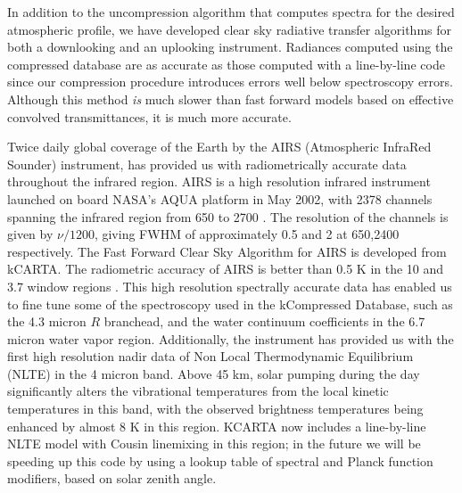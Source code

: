 \documentclass[11pt]{article}
\newcommand{\kc}{\textsf{kCARTA}\xspace}
\begin{document}
In addition to the uncompression algorithm that computes spectra for the
desired atmospheric profile, we have developed clear sky radiative transfer 
algorithms for both a downlooking and an uplooking instrument. Radiances 
computed using the compressed database are as accurate as those computed with
a line-by-line code since our compression procedure introduces errors well 
below spectroscopy errors. Although this method {\em is} much slower than 
fast forward models based on effective convolved transmittances, it is much 
more accurate. 

Twice daily global coverage of the Earth by the AIRS (Atmospheric
InfraRed Sounder) instrument, has provided 
us with radiometrically accurate data throughout the infrared
region. AIRS is a high resolution infrared instrument launched on
board NASA's AQUA platform in May 2002, with 2378 channels spanning
the infrared region from 650 to 2700 \wn. The resolution of the
channels is given by $\nu/1200$, giving FWHM of
approximately 0.5 \wn and 2 \wn at 650,2400 \wn respectively. The Fast
Forward Clear Sky Algorithm for AIRS is developed from \kc \cite{str:02*2}.
The radiometric accuracy of AIRS is better than 0.5 K in the
10 \um and 3.7 \um window regions \cite{aum:02*2}. This high
resolution spectrally accurate data has enabled us to fine tune some
of the spectroscopy used in the kCompressed Database, such as the 4.3
micron \cd $R$ branchead, and the water
continuum coefficients in the 6.7 micron water vapor region. Additionally, 
the instrument has provided us with the first high resolution nadir data of 
Non Local Thermodynamic Equilibrium (NLTE) in the 4 micron \cd band. Above 
45 km, solar pumping during the day
significantly alters the vibrational temperatures from the local kinetic 
temperatures in this band, with the observed brightness temperatures being 
enhanced by almost 8 K in this region. \textsf{KCARTA} now includes a 
line-by-line NLTE model with Cousin linemixing in this region; in the future
we will be speeding up this code by using a lookup table of spectral and Planck
function modifiers, based on solar zenith angle.
\end{document}
